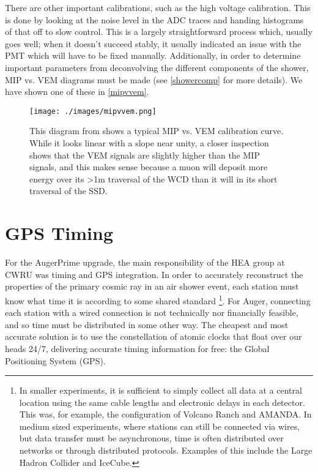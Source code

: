 There are other important calibrations, such as the high voltage calibration. This is done by looking at the noise level in the ADC traces and handing histograms of that off to slow control. This is a largely straightforward process which, usually goes well; when it doesn't succeed stably, it usually indicated an issue with the PMT which will have to be fixed manually. Additionally, in order to determine important parameters from deconvolving the different components of the shower, MIP vs. VEM diagrams must be made (see \autoref{showercomp} for more details). We have shown one of these in \autoref{mipvvem}. 
\begin{figure}[h!]
\begin{center}
\texttt{[image: ./images/mipvvem.png]}
\caption[AugerPrime MIP vs. VEM]{This diagram from \textcite{dynrang} shows a typical MIP vs. VEM calibration curve. While it looks linear with a slope near unity, a closer inspection shows that the VEM signals are slightly higher than the MIP signals, and this makes sense because a muon will deposit more energy over its \textgreater 1m traversal of the WCD than it will in its short traversal of the SSD.}
\label{mipvvem}
\end{center}
\end{figure}

\section{GPS Timing}
For the AugerPrime upgrade, the main responsibility of the HEA group at CWRU was timing and GPS integration. 
In order to accurately reconstruct the properties of the primary cosmic ray in an air shower event, each station must know what time it is according to some shared standard \footnote{In smaller experiments, it is sufficient to simply collect all data at a central location using the same cable lengths and electronic delays in each detector. This was, for example, the configuration of Volcano Ranch and AMANDA. In medium sized experiments, where stations can still be connected via wires, but data transfer must be asynchronous, time is often distributed over networks or through distributed protocols. Examples of this include the Large Hadron Collider and IceCube.}.
For Auger, connecting each station with a wired connection is not technically nor financially feasible, and so time must be distributed in some other way. The cheapest and most accurate solution is to use the constellation of atomic clocks that float over our heads 24/7, delivering accurate timing information for free: the Global Positioning System (GPS). 

